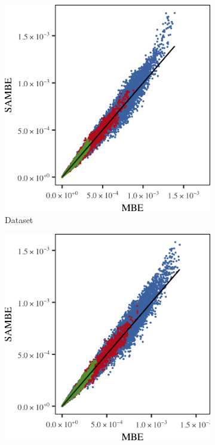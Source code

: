 		\begin{figure}
			\centering
			\begin{subfigure}{0.23\textwidth}
				\centering
				\includegraphics[keepaspectratio=true, width=\textwidth, height=0.23\textheight]{discussion/img/ferdosi_2_60000_mbe_sambe.png}
				\caption{Dataset \ferdosiTwo}
				\label{fig:discussion:performance:mbevssambe:ferdosi2}
			\end{subfigure}
			\begin{subfigure}{0.23\textwidth}
				\centering
				\includegraphics[keepaspectratio=true, width=\textwidth, height=0.23\textheight]{discussion/img/baakman_2_60000_mbe_sambe.png}

\end{subfigure}
\end{figure}
